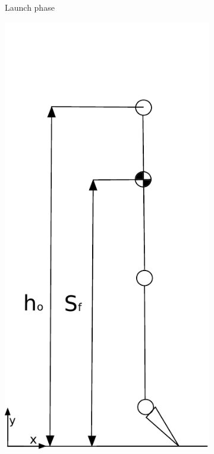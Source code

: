 \begin{figure}[ht!]
\begin{subfigure}[b]{0.3\textwidth}
        \caption{Launch phase}
        \label{fig:launch_phase}
    \end{subfigure}
    \begin{subfigure}[b]{0.3\textwidth}
        \includegraphics[width=\textwidth]{figures/takeoff_phase.pdf}

\end{subfigure}
\end{figure}
